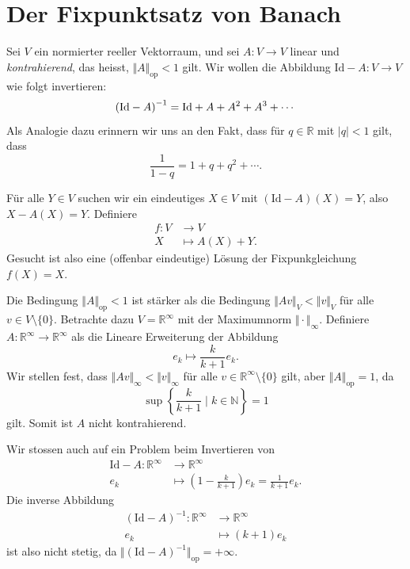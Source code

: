 \documentclass[../main.tex]{subfiles}
\begin{document}
\section{Der Fixpunktsatz von Banach}
\begin{motivation}
  Sei $V$ ein normierter reeller Vektorraum,
  und sei $A \colon V \to V$ linear und \emph{kontrahierend},
  das heisst, %
  $\Vert A \Vert_{\text{op}} < 1$ gilt.
  Wir wollen die Abbildung $\text{Id} - A \colon V \to V$ wie folgt
  invertieren:
  \[
    {(\text{Id} - A)}^{-1} = \textup{Id} + A + A^2 + A^3 + \cdots
  \]
  Als Analogie dazu erinnern wir uns an den Fakt, dass
  für $q \in \mathbb{R}$ mit $|q| < 1$ gilt, dass
  \[
    \frac{1}{1-q} = 1 + q + q^2 + \cdots.
  \]

  Für alle $Y \in V$ suchen wir ein eindeutiges $X \in V$ 
  mit $(\text{Id} - A)(X) = Y$, also
  $X - A(X) = Y$.
  Definiere
  \begin{align*}
    f \colon V & \to V \\
    X & \mapsto A(X) + Y.
  \end{align*}
  Gesucht ist also eine (offenbar eindeutige) Lösung
  der Fixpunkgleichung $f(X) = X$.
\end{motivation}

\begin{remark}
  Die Bedingung $\Vert A \Vert_{\text{op}} < 1$ ist stärker als die
  Bedingung $\Vert A v \Vert_V < \Vert v \Vert_V$ für alle $v
  \in V \setminus \{0\}$.
  Betrachte dazu $V = \mathbb{R}^{\infty}$ mit der Maximumnorm
  $\Vert \cdot \Vert_{\infty}$.
  Definiere $A \colon \mathbb{R}^{\infty} \to \mathbb{R}^{\infty}$ 
  als die Lineare Erweiterung der Abbildung
  \[
    e_k \mapsto \frac{k}{k+1}e_k.
  \]
  Wir stellen fest, dass $\Vert A v \Vert_{\infty} < \Vert v \Vert_{\infty}$ 
  für alle $v \in \mathbb{R}^{\infty} \setminus \{0\}$ gilt,
  aber $\Vert A \Vert_{\text{op}} = 1$, da
  \[
    \sup \left\{\frac{k}{k+1} \mid k \in \mathbb{N}\right\} = 1
  \]
  gilt. Somit ist $A$ nicht kontrahierend.
  
  Wir stossen auch auf ein Problem beim Invertieren von
  \begin{align*}
    \text{Id} - A \colon \mathbb{R}^{\infty} & \to \mathbb{R}^{\infty} \\
    e_k & \mapsto \left( 1 - \frac{k}{k+1} \right)e_k
    = \frac{1}{k+1}e_k.
  \end{align*}
  Die inverse Abbildung
  \begin{align*}
    {(\text{Id} - A)}^{-1} \colon \mathbb{R}^{\infty} & \to \mathbb{R}^{\infty} \\
    e_k & \mapsto (k+1) e_k
  \end{align*}
  ist also nicht stetig, da $\Vert {(\text{Id} - A)}^{-1} \Vert_{\text{op}}
  = +\infty$.
\end{remark}
\end{document}
